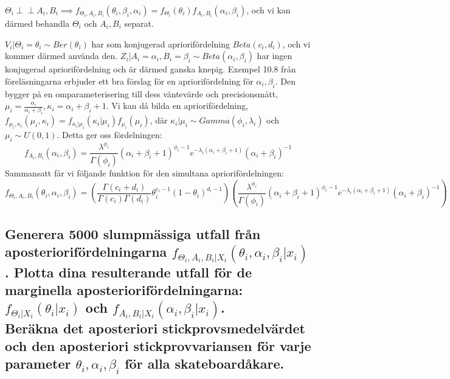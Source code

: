 \documentclass{article}
\newcommand{\independent}{\perp\!\!\!\!\perp}
\begin{document}
$\Theta_i \independent A_i, B_i \implies f_{\Theta_i, A_i, B_i}(\theta_i, \beta_i, \alpha_i)=f_{\Theta_i}(\theta_i) f_{A_i, B_i}(\alpha_i, \beta_i)$,
och vi kan därmed behandla $\Theta_i$ och $A_i, B_i$ separat. 

$V_i | \Theta_i = \theta_i \sim Ber(\theta_i)$ har som konjugerad apriorifördelning $Beta(c_i, d_i)$, och vi kommer därmed använda den.
$Z_i | A_i = \alpha_i, B_i = \beta_i \sim Beta(\alpha_i, \beta_i)$ har ingen konjugerad apriorifördelning och är därmed ganska knepig.
Exempel 10.8 från föreläsningarna erbjuder ett bra förslag för en apriorifördelning för $\alpha_i, \beta_i$.
Den bygger på en omparameterisering till dess väntevärde och precisionsmått, $\mu_i = \frac{\alpha_i}{\alpha_i + \beta_i}, \kappa_i = \alpha_i + \beta_i + 1$.
Vi kan då bilda en apriorifördelning, $f_{\mu_i, \kappa_i}(\mu_i, \kappa_i) = f_{\kappa_i | \mu_i}(\kappa_i | \mu_i) f_{\mu_i}(\mu_i)$, där $\kappa_i | \mu_i \sim Gamma(\phi_i, \lambda_i)$ och $\mu_i \sim U(0,1)$.
Detta ger oss fördelningen:
\[
    f_{A_i, B_i}(\alpha_i, \beta_i) = \frac{\lambda^{\phi_i}}{\Gamma(\phi_i)} (\alpha_i + \beta_i + 1)^{\phi_i - 1} e^{-\lambda_i(\alpha_i + \beta_i + 1)} (\alpha_i + \beta_i)^{-1}  
\]
Sammansatt får vi följande funktion för den simultana apriorifördelningen:
\[ 
    f_{\Theta_i, A_i, B_i}(\theta_i, \alpha_i, \beta_i) = 
    (\frac{\Gamma(c_i + d_i)}{\Gamma(c_i) \Gamma(d_i)} \theta_i^{c_i-1} (1-\theta_i)^{d_i-1}) 
    (\frac{\lambda^{\phi_i}}{\Gamma(\phi_i)} (\alpha_i + \beta_i + 1)^{\phi_i - 1} e^{-\lambda_i(\alpha_i + \beta_i + 1)} (\alpha_i + \beta_i)^{-1}) 
\]

\subsection{Generera 5000 slumpmässiga utfall från aposteriorifördelningarna $f_{\Theta_i, A_i, B_i | X_i}(\theta_i, \alpha_i, \beta_i | x_i)$.
Plotta dina resulterande utfall för de marginella aposteriorifördelningarna: \\
$f_{\Theta_i | X_i}(\theta_i | x_i)$ och $f_{A_i, B_i | X_i}(\alpha_i, \beta_i | x_i)$. \\
Beräkna det aposteriori stickprovsmedelvärdet och den aposteriori stickprovvariansen för varje parameter $\theta_i, \alpha_i, \beta_i$ för alla skateboardåkare.}
\end{document}
